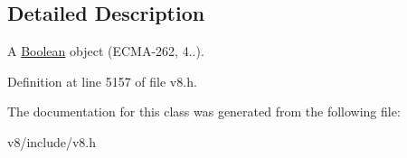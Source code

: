 \subsection{Detailed Description}
A \mbox{\hyperlink{classv8_1_1Boolean}{Boolean}} object (E\+C\+M\+A-\/262, 4..). 

Definition at line 5157 of file v8.\+h.



The documentation for this class was generated from the following file\+:\begin{DoxyCompactItemize}
\item 
v8/include/v8.\+h\end{DoxyCompactItemize}
